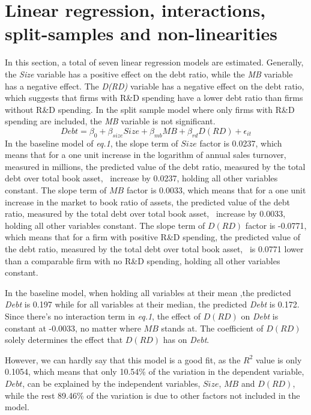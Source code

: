 \documentclass{article}
\begin{document}
\section*{Linear regression, interactions, split-samples and non-linearities}
In this section, a total of seven linear regression models are estimated. Generally, the \textit{Size} variable has a positive
effect on the debt ratio, while the \textit{MB} variable has a negative effect. The \textit{D(RD)} variable has a negative effect
on the debt ratio, which suggests that firms with R\&D spending have a lower debt ratio than firms without R\&D spending.
In the split sample model where only firms with R\&D spending are included, the \textit{MB} variable is not significant.
\begin{equation}
    Debt = \beta_0 + \beta_{size} Size + \beta_{mb} MB + \beta_{rd} D(RD) + \epsilon_{it}
\end{equation}
In the baseline model of \textit{eq.1}, the slope term of $Size$ factor is 0.0237,
which means that for a one unit increase in the logarithm of annual sales turnover,
measured in millions, the predicted value of the debt ratio, measured by the total debt over total book asset, \
increase by 0.0237, holding all other variables constant.
The slope term of $MB$ factor is 0.0033, which means that for a one unit increase in the market to book ratio of assets,
the predicted value of the debt ratio, measured by the total debt over total book asset, \
increase by 0.0033, holding all other variables constant.
The slope term of $D(RD)$ factor is -0.0771, which means that for a firm with positive R\&D spending,
the predicted value of the debt ratio, measured by the total debt over total book asset, \
is 0.0771 lower than a comparable firm with no R\&D spending, holding all other variables constant.

In the baseline model, when holding all variables at their mean ,the predicted \textit{Debt} is 0.197 while for all variables at their median,
the predicted \textit{Debt} is 0.172. Since there's no interaction term in \textit{eq.1}, the effect of $D(RD)$ on \textit{Debt} is constant
at -0.0033, no matter where $MB$ stands at. The coefficient of $D(RD)$ solely determines the effect that $D(RD)$ has on \textit{Debt}.

However, we can hardly say that this model is a good fit, as the $R^2$ value is only 0.1054, which means that only 10.54\% of the
variation in the dependent variable, $Debt$, can be explained by the independent variables, $Size$, $MB$ and $D(RD)$,
while the rest 89.46\% of the variation is due to other factors not included in the model.
\end{document}
